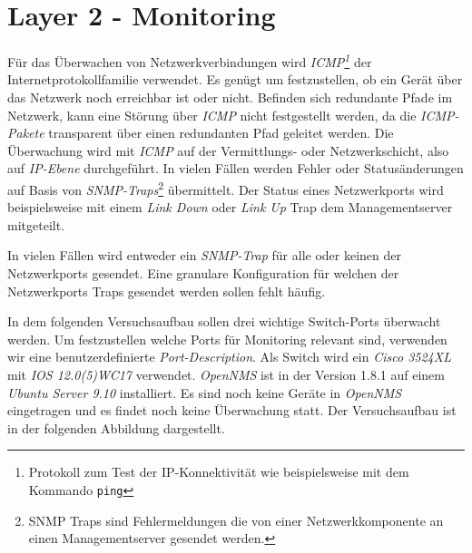 \section{Layer 2 - Monitoring}
Für das Überwachen von Netzwerkverbindungen wird \emph{ICMP\footnote{Protokoll zum Test der IP-Konnektivität wie beispielsweise mit dem Kommando \texttt{ping}}} der Internetprotokollfamilie verwendet. Es genügt um festzustellen, ob ein Gerät über das Netzwerk noch erreichbar ist oder nicht. Befinden sich redundante Pfade im Netzwerk, kann eine Störung über \emph{ICMP} nicht festgestellt werden, da die \emph{ICMP-Pakete} transparent über einen redundanten Pfad geleitet werden. Die Überwachung wird mit \emph{ICMP} auf der Vermittlungs- oder Netzwerkschicht, also auf \emph{IP-Ebene} durchgeführt. In vielen Fällen werden Fehler oder Statusänderungen auf Basis von \emph{SNMP-Traps}\footnote{SNMP Traps sind Fehlermeldungen die von einer Netzwerkkomponente an einen Managementserver gesendet werden.} übermittelt. Der Status eines Netzwerkports wird beispielsweise mit einem \emph{Link Down} oder \emph{Link Up} Trap dem Managementserver mitgeteilt.


In vielen Fällen wird entweder ein \emph{SNMP-Trap} für alle oder keinen der  Netzwerkports gesendet. Eine granulare Konfiguration für welchen der Netzwerkports Traps gesendet werden sollen fehlt häufig.

In dem folgenden Versuchsaufbau sollen drei wichtige Switch-Ports überwacht werden. Um festzustellen welche Ports für Monitoring relevant sind, verwenden wir eine benutzerdefinierte \emph{Port-Description}. Als Switch wird ein \emph{Cisco 3524XL} mit \emph{IOS 12.0(5)WC17} verwendet. \emph{OpenNMS} ist in der Version 1.8.1 auf einem \emph{Ubuntu Server 9.10} installiert. Es sind noch keine Geräte in \emph{OpenNMS} eingetragen und es findet noch keine Überwachung statt. Der Versuchsaufbau ist in der folgenden Abbildung dargestellt.

